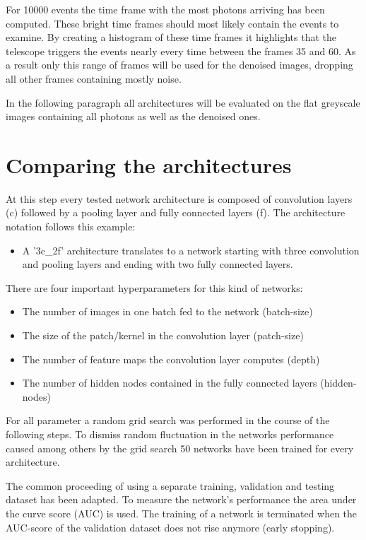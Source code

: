 For \num{10000} events the time frame with the most photons arriving has been computed.
These bright time frames should most likely contain the events to examine.
By creating a histogram of these time frames it highlights
that the telescope triggers the events nearly every time between the frames \num{35} and \num{60}.
As a result only this range of frames will be used for the denoised images, dropping all other frames containing mostly noise.

In the following paragraph all architectures will be evaluated on the flat greyscale images
containing all photons as well as the denoised ones.


\section{Comparing the architectures}
At this step every tested network architecture is composed of convolution layers (c)
followed by a pooling layer and fully connected layers (f).
The architecture notation follows this example:

\begin{itemize}
\item A '3c\_2f' architecture translates to a network
starting with three convolution and pooling layers and ending with two fully connected layers.
\end{itemize}

There are four important hyperparameters for this kind of networks:

\begin{itemize}
\item The number of images in one batch fed to the network (batch-size)
\item The size of the patch/kernel in the convolution layer (patch-size)
\item The number of feature maps the convolution layer computes (depth)
\item The number of hidden nodes contained in the fully connected layers (hidden-nodes)
\end{itemize}

For all parameter a random grid search was performed in the course of the following steps.
To dismiss random fluctuation in the networks performance caused among others by the grid search
\num{50} networks have been trained for every architecture.

The common proceeding of using a separate training, validation and testing dataset has been adapted.
To measure the network's performance the area under the curve score (AUC) is used.
The training of a network is terminated when the AUC-score of the validation dataset does not rise anymore (early stopping).

